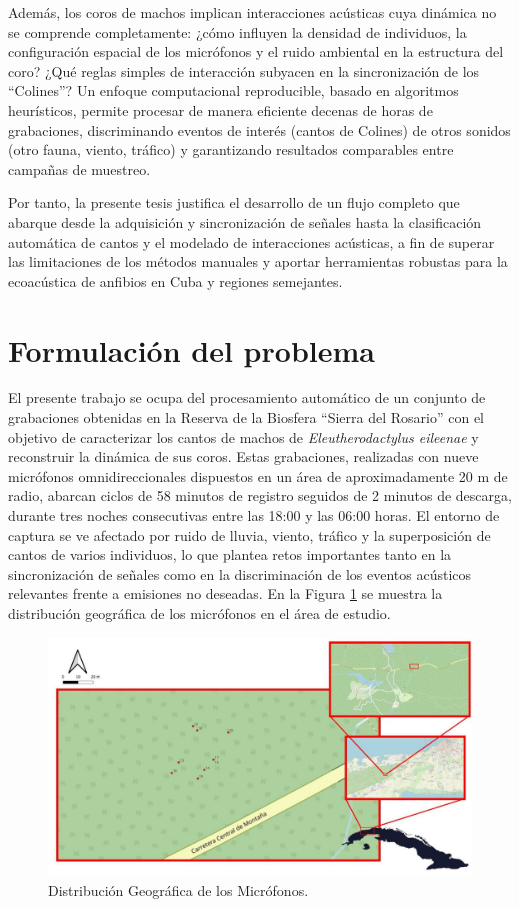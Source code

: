 Además, los coros de machos implican interacciones acústicas 
cuya dinámica no se comprende completamente: ¿cómo influyen la 
densidad de individuos, la configuración espacial de los 
micrófonos y el ruido ambiental en la estructura del coro? 
¿Qué reglas simples de interacción subyacen en la sincronización 
de los “Colines”? Un enfoque computacional reproducible, basado 
en algoritmos heurísticos, permite procesar de 
manera eficiente decenas de horas de grabaciones, discriminando 
eventos de interés (cantos de Colines) de otros sonidos 
(otro fauna, viento, tráfico) y garantizando resultados 
comparables entre campañas de muestreo.

Por tanto, la presente tesis justifica el desarrollo de un 
flujo completo que abarque desde la adquisición y sincronización 
de señales hasta la clasificación automática de cantos y el 
modelado de interacciones acústicas, a fin de superar las 
limitaciones de los métodos manuales y aportar herramientas 
robustas para la ecoacústica de anfibios en Cuba y regiones 
semejantes.

\section{Formulación del problema}
\label{sec:formulacion_problema}

El presente trabajo se ocupa del procesamiento automático de un 
conjunto de grabaciones obtenidas en la Reserva de 
la Biosfera “Sierra del Rosario” con el objetivo de 
caracterizar los cantos de machos de 
\emph{Eleutherodactylus eileenae} y reconstruir la dinámica de 
sus coros. Estas grabaciones, realizadas con nueve micrófonos 
omnidireccionales dispuestos en un área de aproximadamente 20 m 
de radio, abarcan ciclos de 58 minutos de registro seguidos de 
2 minutos de descarga, durante tres noches consecutivas entre 
las 18:00 y las 06:00 horas. El entorno de captura se ve 
afectado por ruido de lluvia, viento, tráfico y la superposición 
de cantos de varios individuos, lo que plantea retos importantes 
tanto en la sincronización de señales como en la discriminación 
de los eventos acústicos relevantes frente a emisiones no 
deseadas. En la Figura \ref{fig:map} se muestra la distribución geográfica de los micrófonos en el área de estudio.

\begin{figure}[h!]
    \centering
    \includegraphics[width=\columnwidth]{Graphics/mic_map.jpg}
    \caption{Distribución Geográfica de los Micrófonos.}
    \label{fig:map}
\end{figure}

